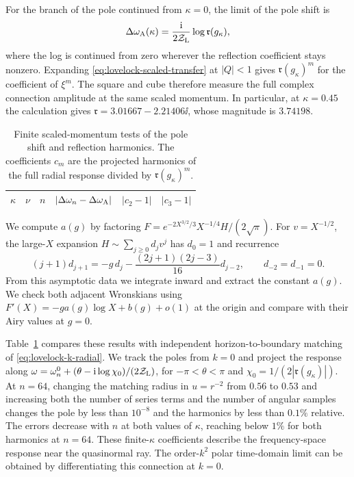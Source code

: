 For the branch of the pole continued from \(\kappa=0\), the limit
of the pole shift is
\begin{equation}
 \Delta\omega_{\rm A}(\kappa)
   =\frac{\mathrm{i}}{2\mathcal Z_{\rm L}}\log\mathfrak r(g_\kappa),
 \label{eq:lovelock-scaled-shift}
\end{equation}
where the log is continued from zero wherever the reflection
coefficient stays nonzero. Expanding \eqref{eq:lovelock-scaled-transfer}
at \(|Q|<1\) gives \(\mathfrak r(g_\kappa)^m\) for the coefficient of
\(\xi^m\). The square and cube therefore measure the full complex
connection amplitude at the same scaled momentum. In particular,
at \(\kappa=0.45\) the calculation gives
\(\mathfrak r=3.01667-2.21406\ii\), whose magnitude is \(3.74198\).

\begin{table}[t]
 \centering\small
 \begin{tabular}{cccccc}
 \hline
 \(\kappa\) & \(\nu\) & \(n\) &
 \(\lvert\Delta\omega_n-\Delta\omega_{\rm A}\rvert\) &
 \(\lvert c_2-1\rvert\) & \(\lvert c_3-1\rvert\) \\
 \hline
 
 \end{tabular}
 \caption{Finite scaled-momentum tests of the pole shift and reflection
 harmonics. The coefficients \(c_m\) are the projected harmonics of the
 full radial response divided by \(\mathfrak r(g_\kappa)^m\).}
 \label{tab:lovelock-scaled-momentum}
\end{table}

We compute \(a(g)\) by factoring
\(F=e^{-2X^{3/2}/3}X^{-1/4}H/(2\sqrt\pi)\). For
\(v=X^{-1/2}\), the large-\(X\) expansion
\(H\sim\sum_{j\geq0}d_jv^j\) has \(d_0=1\) and recurrence
\begin{equation}
 (j+1)d_{j+1}=-g\,d_j-\frac{(2j+1)(2j-3)}{16}d_{j-2},
 \qquad d_{-2}=d_{-1}=0 .
\end{equation}
From this asymptotic data we integrate inward and extract the
constant \(a(g)\). We check both adjacent Wronskians using
\(F'(X)=-g a(g)\log X+b(g)+o(1)\) at the origin and compare with
their Airy values at \(g=0\).

Table~\ref{tab:lovelock-scaled-momentum} compares these results with
independent horizon-to-boundary matching of
\eqref{eq:lovelock-k-radial}. We track the poles from \(k=0\) and
project the response along
\(\omega=\omega_n^0+(\theta-\mathrm{i}\log\chi_0)/(2\mathcal Z_{\rm L})\),
for \(-\pi<\theta<\pi\) and
\(\chi_0=1/(2|\mathfrak r(g_\kappa)|)\).
At \(n=64\), changing the matching radius in \(u=r^{-2}\) from
\(0.56\) to \(0.53\) and increasing both the number of series
terms and the number of angular samples changes the pole by
less than \(10^{-8}\) and the harmonics by less than \(0.1\%\)
relative. The errors decrease with \(n\) at both values of
\(\kappa\), reaching below \(1\%\) for both harmonics at \(n=64\).
These finite-\(\kappa\) coefficients describe the
frequency-space response near the quasinormal ray. The order-\(k^2\)
polar time-domain limit can be obtained by differentiating this
connection at \(k=0\).
